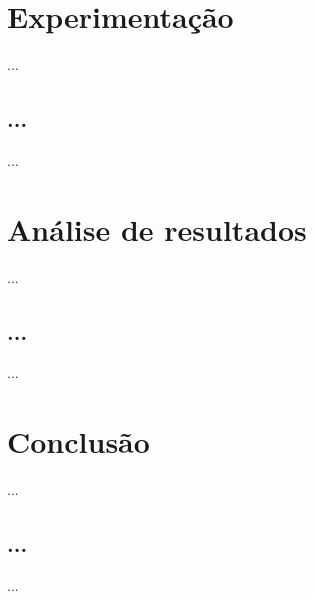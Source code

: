 \documentclass[a4paper]{article}
\begin{document}
\cleardoublepage
\section{Experimentação}
\indent \indent ...

\cleardoublepage

\subsection{...}
\indent \indent ...

\cleardoublepage
\section{Análise de resultados}
\indent \indent ...

\cleardoublepage

\subsection{...}
\indent \indent ...

\cleardoublepage
\section{Conclusão}
\indent \indent ...

\cleardoublepage

\subsection{...}
\indent \indent ...
\end{document}
